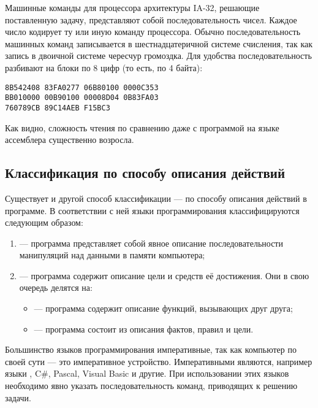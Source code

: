 Машинные команды для процессора архитектуры IA-32, решающие
поставленную задачу, представляют собой последовательность
чисел. Каждое число кодирует ту или иную команду процессора. Обычно
последовательность машинных команд записывается в шестнадцатеричной
системе счисления, так как запись в двоичной системе чересчур
громоздка. Для удобства последовательность разбивают на блоки по 8
цифр (то есть, по 4 байта):

\begin{lstlisting}
8B542408 83FA0277 06B80100 0000C353
BB010000 00B90100 00008D04 0B83FA03
760789CB 89C14AEB F15BC3
\end{lstlisting}

Как видно, сложность чтения по сравнению даже с программой на языке
ассемблера существенно возросла.

\subsection{Классификация по способу описания действий}

Существует и другой способ классификации — по способу описания
действий в программе.  В соответствии с ней языки программирования
классифицируются следующим образом:

\begin{enumerate}
\item {} — программа представляет
  собой явное описание последовательности манипуляций над данными в
  памяти компьютера;
\item {} — программа содержит
  описание цели и средств её достижения. Они в свою очередь делятся
  на:
  \begin{itemize}
  \item {} — программа
    содержит описание функций, вызывающих друг друга;
  \item {} — программа состоит из
    описания фактов, правил и цели.
  \end{itemize}
\end{enumerate}

Большинство языков программирования императивные, так как компьютер по
своей сути — это императивное устройство. Императивными являются,
например языки \CPP, C\#, Pascal, Visual Basic и другие. При
использовании этих языков необходимо явно указать последовательность
команд, приводящих к решению задачи.

